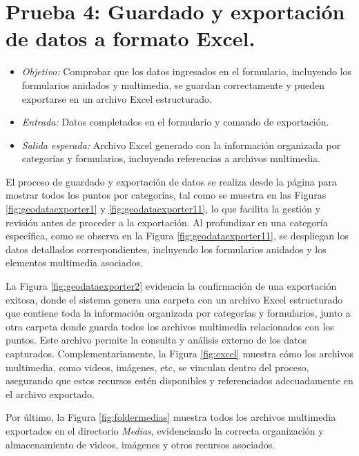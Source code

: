 \documentclass[12pt, a4paper]{book}
\begin{document}
\section{Prueba 4: Guardado y exportación de datos a formato Excel.}
\begin{itemize}
  \item \textit{Objetivo:} Comprobar que los datos ingresados en el formulario, incluyendo los formularios anidados y multimedia, se guardan correctamente y pueden exportarse en un archivo Excel estructurado.
  \item \textit{Entrada:} Datos completados en el formulario y comando de exportación.
  \item \textit{Salida esperada:} Archivo Excel generado con la información organizada por categorías y formularios, incluyendo referencias a archivos multimedia.
\end{itemize}

El proceso de guardado y exportación de datos se realiza desde la página para mostrar todos los puntos por categorías, tal como se muestra en las Figuras \ref{fig:geodataexporter1} y \ref{fig:geodataexporter11}, lo que facilita la gestión y revisión antes de proceder a la exportación. Al profundizar en una categoría específica, como se observa en la Figura \ref{fig:geodataexporter11}, se despliegan los datos detallados correspondientes, incluyendo los formularios anidados y los elementos multimedia asociados. 

La Figura \ref{fig:geodataexporter2} evidencia la confirmación de una exportación exitosa, donde el sistema genera una carpeta con un archivo Excel estructurado que contiene toda la información organizada por categorías y formularios, junto a otra carpeta donde guarda todos los archivos multimedia relacionados con los puntos. Este archivo permite la consulta y análisis externo de los datos capturados. Complementariamente, la Figura \ref{fig:excel} muestra cómo los archivos multimedia, como videos, imágenes, etc, se vinculan dentro del proceso, asegurando que estos recursos estén disponibles y referenciados adecuadamente en el archivo exportado.

Por último, la Figura \ref{fig:foldermedias} muestra todos los archivos multimedia exportados en el directorio \textit{Medias}, evidenciando la correcta organización y almacenamiento de videos, imágenes y otros recursos asociados.
\end{document}
